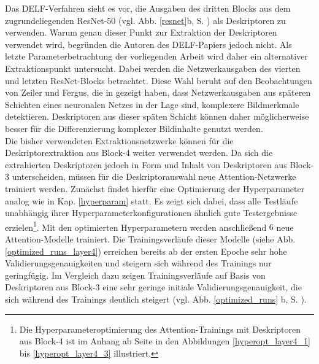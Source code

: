 Das DELF-Verfahren sieht es vor, die Ausgaben des dritten Blocks aus dem zugrundeliegenden ResNet-50 (vgl. Abb. \ref{resnet}b, S. \pageref{resnet}) als Deskriptoren zu verwenden. Warum genau dieser Punkt zur Extraktion der Deskriptoren verwendet wird, begründen die Autoren des DELF-Papiers \cite{delf} jedoch nicht. Als letzte Parameterbetrachtung der vorliegenden Arbeit wird daher ein alternativer Extraktionspunkt untersucht. Dabei werden die Netzwerkausgaben des vierten und letzten ResNet-Blocks betrachtet. Diese Wahl beruht auf den Beobachtungen von Zeiler und Fergus, die in \cite{extraction_point_meaning} gezeigt haben, dass Netzwerkausgaben aus späteren Schichten eines neuronalen Netzes in der Lage sind, komplexere Bildmerkmale detektieren. Deskriptoren aus dieser späten Schicht können daher möglicherweise besser für die Differenzierung komplexer Bildinhalte genutzt werden.
\\
Die bisher verwendeten Extraktionsnetzwerke können für die Deskriptorextraktion aus Block-4 weiter verwendet werden. Da sich die extrahierten Deskriptoren jedoch in Form und Inhalt von Deskriptoren aus Block-3 unterscheiden, müssen für die Deskriptorauswahl neue Attention-Netzwerke trainiert werden. Zunächst findet hierfür eine Optimierung der Hyperparameter analog wie in Kap. \ref{hyperparam} statt. Es zeigt sich dabei, dass alle Testläufe unabhängig ihrer Hyperparameterkonfigurationen ähnlich gute Testergebnisse erzielen\footnote{Die Hyperparameteroptimierung des Attention-Trainings mit Deskriptoren aus Block-4 ist im Anhang ab Seite \pageref{hyperopt_layer4_1} in den Abbildungen \ref{hyperopt_layer4_1} bis \ref{hyperopt_layer4_3} illustriert.}. Mit den optimierten Hyperparametern werden anschließend $6$ neue Attention-Modelle trainiert. Die Trainingsverläufe dieser Modelle (siehe Abb. \ref{optimized_runs_layer4}) erreichen bereits ab der ersten Epoche sehr hohe Validierungsgenauigkeiten und steigern sich während des Trainings nur geringfügig. Im Vergleich dazu zeigen Trainingsverläufe auf Basis von Deskriptoren aus Block-3 eine sehr geringe initiale Validierungsgenauigkeit, die sich während des Trainings deutlich steigert (vgl. Abb. \ref{optimized_runs} b, S. \pageref{optimized_runs}). 
